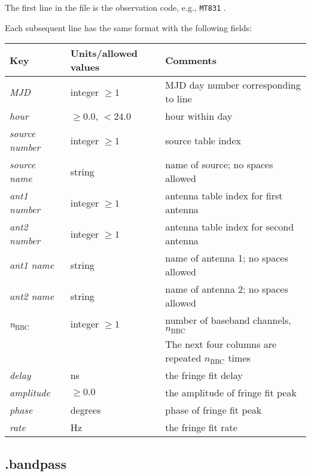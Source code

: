 The first line in the file is the observation code, e.g., {\tt MT831} .

Each subsequent line has the same format with the following fields:

\begin{center}
\begin{tabular}{l l l}
\hline
Key & Units/allowed values & Comments \\
\hline
{\it MJD}           & integer $\ge 1$    & MJD day number corresponding to line \\
{\it hour}          & $\ge 0.0$, $< 24.0$ & hour within day \\
{\it source number} & integer $\ge 1$    & source table index \\
{\it source name}   & string             & name of source; no spaces allowed \\
{\it ant1 number}   & integer $\ge 1$    & antenna table index for first antenna \\
{\it ant2 number}   & integer $\ge 1$    & antenna table index for second antenna \\
{\it ant1 name}     & string             & name of antenna 1; no spaces allowed \\
{\it ant2 name}     & string             & name of antenna 2; no spaces allowed \\
{\it n}$_{\mathrm{BBC}}$  & integer $\ge 1$    & number of baseband channels, $n_{\mathrm{BBC}}$ \\
& & The next four columns are repeated $n_{\mathrm{BBC}}$ times \\
\hline
{\it delay}         & ns                 & the fringe fit delay \\
{\it amplitude}     & $\ge 0.0$          & the amplitude of fringe fit peak \\
{\it phase}         & degrees            & phase of fringe fit peak \\
{\it rate}          & Hz                 & the fringe fit rate \\
\hline
\end{tabular}
\end{center}









\subsection{.bandpass} \label{sec:filebandpass}


